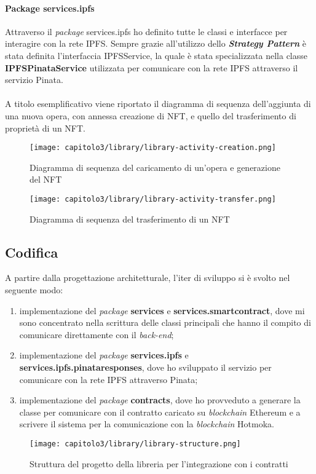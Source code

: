 \paragraph{Package services.ipfs} Attraverso il \textit{package} services.ipfs ho definito tutte le classi e interfacce per interagire con la rete IPFS. Sempre grazie all'utilizzo dello \textit{\textbf{Strategy Pattern}} è stata definita l'interfaccia IPFSService, la quale è stata specializzata nella classe \textbf{IPFSPinataService} utilizzata per comunicare con la rete IPFS attraverso il servizio Pinata.

\paragraph{}

A titolo esemplificativo viene riportato il diagramma di sequenza dell'aggiunta di una nuova opera, con annessa creazione di NFT, e quello del trasferimento di proprietà di un NFT.

\begin{figure}[h!]
  \centering
  \texttt{[image: capitolo3/library/library-activity-creation.png]}
  \caption{Diagramma di sequenza del caricamento di un'opera e generazione del NFT}
\end{figure}

\begin{figure}[h!]
  \centering
  \texttt{[image: capitolo3/library/library-activity-transfer.png]}
  \caption{Diagramma di sequenza del trasferimento di un NFT}
\end{figure}

\subsection{Codifica}
A partire dalla progettazione architetturale, l'iter di sviluppo si è svolto nel seguente modo:
\begin{enumerate}
  \item implementazione del \textit{package} \textbf{services} e \textbf{services.smartcontract}, dove mi sono concentrato nella scrittura delle classi principali che hanno il compito di comunicare direttamente con il \textit{back-end};
  \item implementazione del \textit{package} \textbf{services.ipfs} e \textbf{services.ipfs.pinataresponses}, dove ho sviluppato il servizio per comunicare con la rete IPFS attraverso Pinata;
  \item implementazione del \textit{package} \textbf{contracts}, dove ho provveduto a generare la classe per comunicare con il contratto caricato su \textit{blockchain} Ethereum e a scrivere il sistema per la comunicazione con la \textit{blockchain} Hotmoka.
\end{enumerate}
\begin{figure}[h!]
  \centering
  \texttt{[image: capitolo3/library/library-structure.png]}
  \caption{Struttura del progetto della libreria per l'integrazione con i contratti}
\end{figure}

